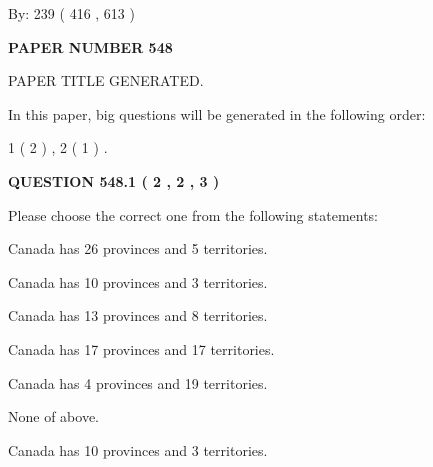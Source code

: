 \documentclass[12pt]{article}
\begin{document}
   
\hspace{1.0in} By: 
 239 ( 416 ,  613 )
   
   
   
   
\newpage 
\setcounter{page}{ 
   548001 } 
   
   
   
   
 {\textbf{ \Large{ PAPER NUMBER  548  }}}
   
   
\vspace{0.2in}
   
   
   
   
   
   
   
   
 \vspace{0.2in}
 
 
 
 
   
   
 PAPER TITLE GENERATED.
   
   
   
\vspace{0.2in}
   
In this paper, big questions will be generated in the following order: 
   
   
   1 ( 2 )
 ,
   2 ( 1 )
 .
  
\vspace{0.2in}
  
{\textbf{\Large{QUESTION
548.1 
 ( 2 , 2 , 3 )
}}}
  
  
Please choose the correct one from the following statements:
 
 
Canada has  26 provinces and  5 territories.
 
 
Canada has 10  provinces and 3 territories.
 
 
Canada has  13 provinces and  8 territories.
 
 
Canada has  17 provinces and  17 territories.
 
 
Canada has   4 provinces and  19 territories.
 
 
 None of above.
 
 
\noindent{}
 
 
Canada has 10  provinces and 3 territories.
 
\end{document}
